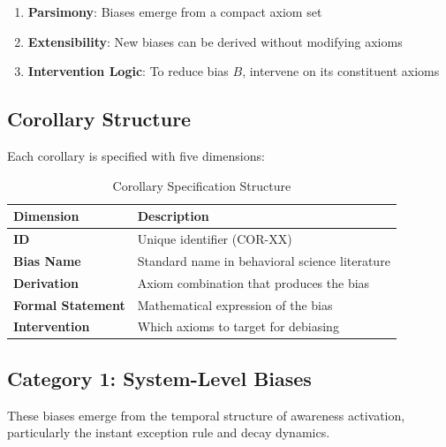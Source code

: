 \begin{enumerate}
    \item \textbf{Parsimony}: Biases emerge from a compact axiom set
    \item \textbf{Extensibility}: New biases can be derived without modifying axioms
    \item \textbf{Intervention Logic}: To reduce bias $B$, intervene on its constituent axioms
\end{enumerate}

\subsection{Corollary Structure}

Each corollary is specified with five dimensions:

\begin{table}[htbp]
\centering
\caption{Corollary Specification Structure}
\label{tab:corollary-structure}
\begin{tabular}{lp{9cm}}
\toprule
\textbf{Dimension} & \textbf{Description} \\
\midrule
\textbf{ID} & Unique identifier (COR-XX) \\
\textbf{Bias Name} & Standard name in behavioral science literature \\
\textbf{Derivation} & Axiom combination that produces the bias \\
\textbf{Formal Statement} & Mathematical expression of the bias \\
\textbf{Intervention} & Which axioms to target for debiasing \\
\bottomrule
\end{tabular}
\end{table}


\subsection{Category 1: System-Level Biases}

These biases emerge from the temporal structure of awareness activation, particularly the instant exception rule and decay dynamics.

